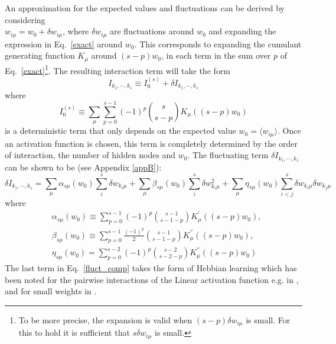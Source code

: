 \documentclass[11pt,letterpaper]{article}
\begin{document}
An approximation for the expected values and fluctuations can be derived by considering\\ $w_{i\mu} = w_{0}+\delta w_{i\mu}$, where $\delta w_{i\mu}$ are fluctuations around $w_{0}$ and expanding the expression in Eq.~\eqref{exact} around $w_{0}$. This corresponds to expanding the cumulant generating function $K_{\mu}$ around $(s-p)w_0$, in each term in the sum over $p$ of Eq.~\eqref{exact}\footnote{To be more precise, the expansion is valid when $(s-p)\delta w_{i\mu}$ is small. For this to hold it is sufficient that $s\delta w_{i\mu}$ is small.}. The resulting interaction term will take the form
\begin{equation}
    I_{k_{1},\cdots,k_{s}} \equiv I_{0}^{(s)} + \delta I_{k_{1},\cdots,k_{s}}
    \label{inter_terms}
\end{equation}
where
\begin{equation}
    I_{0}^{(s)} \equiv \sum_{\mu}\sum_{p=0}^{s-1}(-1)^{p} \binom{s}{s-p}  K_{\mu}\left((s-p)w_{0}\right)
    \label{i0}
\end{equation}
is a deterministic term that only depends on the expected value $w_{0}=\langle w_{i\mu}\rangle$. Once an activation function is chosen, this term is completely determined by the order of interaction, the number of hidden nodes and $w_{0}$. The fluctuating term $\delta I_{k_{1},\cdots,k_{s}}$ can be shown to be (see Appendix \ref{appB}):
\begin{equation}
    \delta I_{k_{1},\cdots,k_{s}}=\sum_{\mu}\alpha_{s\mu}(w_0) \sum_{i}^{s} \delta w_{k_{i}\mu} + \sum_{\mu}\beta_{s\mu}(w_0) \sum_{i}^{s} \delta w_{k_{i}\mu}^{2} + \sum_{\mu}\eta_{s\mu}(w_0) \sum_{i<j}^{s}  \delta w_{k_{i}\mu}\delta w_{k_{j}\mu}
    \label{fluct_comp}
\end{equation}
where 
\begin{align}
&\alpha_{s\mu}(w_{0}) \equiv \sum_{p=0}^{s-1}(-1)^{p}\binom{s-1}{s-1-p} K_{\mu}^{'}\left((s-p)w_{0}\right),
\label{alpha}\\
&\beta_{s\mu}(w_{0}) \equiv \sum_{p=0}^{s-1}\frac{(-1)^{p}}{2}\binom{s-1}{s-1-p} K_{\mu}^{''}\left((s-p)w_{0}\right),
    \label{beta}\\
&\eta_{s\mu}(w_0) = \sum_{p=0}^{s-2}(-1)^{p}\binom{s-2}{s-2-p} K_{\mu}^{''}\left((s-p)w_{0}\right)
    \label{eta}
\end{align}
The last term in Eq.~\eqref{fluct_comp} takes the form of Hebbian learning which has been noted for the pairwise interactions of the Linear activation function e.g. in \cite{LEONELLI2021314}, and for small weights in \cite{10.1162/neco_a_01420}.
\end{document}
